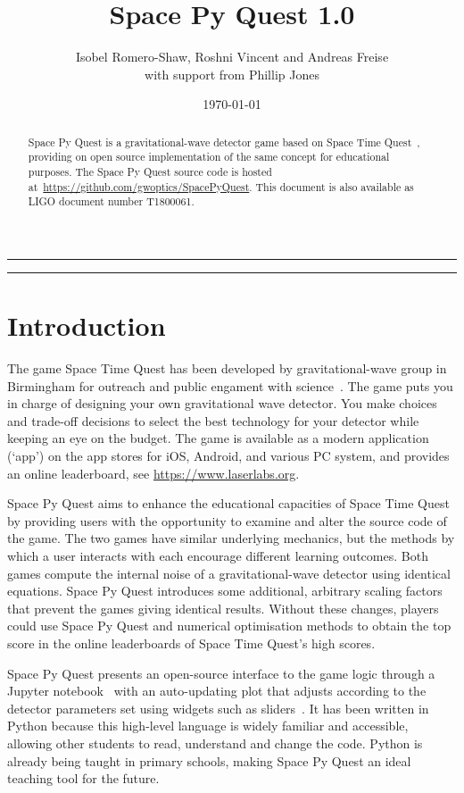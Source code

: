 \documentclass{article}
\title{Space Py Quest 1.0}
\author{Isobel Romero-Shaw,  Roshni Vincent and Andreas Freise\\
{\small with support from Phillip Jones}}
\date{\today}
\makeatletter
\renewcommand\tableofcontents{%
\@starttoc{toc}%
}
\makeatother
\begin{document}
\maketitle

\vspace{1cm}
\begin{abstract}
\noindent
Space Py Quest is a gravitational-wave detector game based on
Space Time Quest~\cite{stq}, providing on open source implementation
of the same concept for educational purposes.
The Space Py Quest source code is
hosted  at~\url{https://github.com/gwoptics/SpacePyQuest}. 
This document is also available as LIGO document number T1800061.
\end{abstract}
\vspace{5mm}
\vfill
\hrule
\tableofcontents
\vspace{3mm}
\hrule
\clearpage

\section{Introduction}
\label{sec:introduction}

The game Space Time Quest has been developed by
gravitational-wave group in Birmingham for outreach and public
engament with science~\cite{carbone12b}.
The game puts you in charge of designing your own gravitational wave
detector. You make choices and trade-off decisions to select the best
technology for your detector while keeping an eye on the budget. 
The game is available as a modern application (`app') on the app
stores for iOS, Android, and various PC system, and provides
an online leaderboard, see \url{https://www.laserlabs.org}.

Space Py Quest aims to enhance the educational
capacities of Space Time Quest by providing users with the opportunity
to examine and alter the source code of the game. The two games have similar
underlying mechanics, but the methods by which a user interacts with
each encourage different learning outcomes. 
Both games compute the internal noise of a gravitational-wave detector
using identical equations. Space Py Quest introduces some additional,
arbitrary scaling factors that prevent the games giving
identical results. Without these changes, players could use Space Py
Quest and numerical optimisation methods to obtain the top score
in the online leaderboards of Space Time Quest's high scores.

Space Py Quest presents an open-source interface to the game logic
through a Jupyter notebook~\cite{jupyter} with an
auto-updating plot that adjusts according to the detector parameters
set using widgets such as sliders~\cite{ipy}. It has been written in Python
because this high-level language is widely familiar and accessible,
allowing other students to read, understand and change the
code. Python is already being taught in primary schools, making
Space Py Quest an ideal teaching tool for the future.
\end{document}
